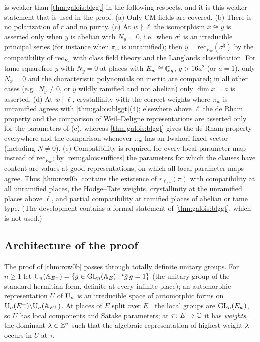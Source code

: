 \begin{remark}\label{rem:galois:blggt}
 is weaker than \cref{thm:galois:blggt} in the following respects, and it is this
weaker statement that is used in the proof.
(a) Only CM fields are covered.
(b) There is no polarization of $r$ and no purity.
(c) At $w\nmid\ell$ the isomorphism $x\cong y$ is asserted only when $y$ is abelian with $N_y=0$, i.e.\
when $\sigma^\natural$ is an irreducible principal series (for instance when $\pi_w$ is unramified); then
$y=\mathrm{rec}_{E_w}(\sigma^\natural)$ by the compatibility of $\mathrm{rec}_{E_w}$ with class field theory
and the Langlands classification. For tame squarefree $y$ with $N_y=0$ at places with $E_w\cong\mathbb{Q}_g$,
$g>16a^2$ (or $a=1$), only $N_x=0$ and the characteristic polynomials on inertia are compared; in all
other cases (e.g.\ $N_y\ne0$, or $y$ wildly ramified and not abelian) only $\dim x=a$ is asserted.
(d) At $w\mid\ell$, crystallinity with the correct weights where $\pi_w$ is unramified agrees with
\cref{thm:galois:blggt}(4); elsewhere above $\ell$ the de Rham property and the comparison of
Weil--Deligne representations are asserted only for the parameters of (c), whereas
\cref{thm:galois:blggt} gives the de Rham property everywhere and the comparison whenever $\pi_w$ has an
Iwahori-fixed vector (including $N\ne0$).
(e) Compatibility is required for every local parameter map instead of $\mathrm{rec}_{E_w}$; by
\cref{rem:galois:suffices} the parameters for which the clauses have content are values at good
representations, on which all local parameter maps agree.
Thus \cref{thm:row0b} contains the existence of $r_{\ell,\iota}(\pi)$ with compatibility at all
unramified places, the Hodge--Tate weights, crystallinity at the unramified places above $\ell$, and
partial compatibility at ramified places of abelian or tame type. (The development contains a formal
statement of \cref{thm:galois:blggt}, which is not used.)
\end{remark}

\subsection{Architecture of the proof}\label{sec:galois:arch}

The proof of \cref{thm:row0b} passes through totally definite unitary groups. For $n\ge1$ let
$\mathrm{U}_n(\mathbb{A}_{E^+})=\{g\in\operatorname{GL}_n(\mathbb{A}_E):{}^t\bar g\,g=1\}$ (the unitary group of the standard hermitian
form, definite at every infinite place); an automorphic representation $U$ of $\mathrm{U}_n$ is an
irreducible space of automorphic forms on $\mathrm{U}_n(E^+)\backslash\mathrm{U}_n(\mathbb{A}_{E^+})$. At places of $E$
split over $E^+$ the local groups are $\operatorname{GL}_n(E_w)$, so $U$ has local components and Satake parameters;
at $\tau\colon E\to\mathbb{C}$ it has \emph{weights}, the dominant $\lambda\in\mathbb{Z}^n$ such that the algebraic
representation of highest weight $\lambda$ occurs in $U$ at $\tau$.

